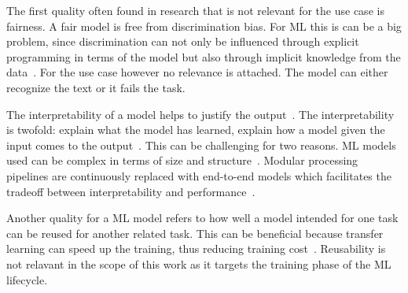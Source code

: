 The first quality often found in research that is not relevant for the use case is fairness.
A fair model is free from discrimination bias.
For \ac{ML} this is can be a big problem, since discrimination can not only be influenced through
explicit programming in terms of the model but also through implicit knowledge from the
data~\citep{vogelsang_requirements_2019}.
For the use case however no relevance is attached.
The model can either recognize the text or it fails the task.

The interpretability of a model helps to justify the output~\citep{ashmore_assuring_2021}.
The interpretability is twofold: explain what the model has learned, explain how a model given the
input comes to the output~\citep{vogelsang_requirements_2019}.
This can be challenging for two reasons.
\ac{ML} models used can be complex in terms of size and structure~\citep{ashmore_assuring_2021}.
Modular processing pipelines are continuously replaced with end-to-end
models which facilitates the tradeoff between interpretability and
performance~\cite{arpteg_software_2018}.

Another quality for a \ac{ML} model refers to how well a model intended for one task can be reused
for another related task.
This can be beneficial because transfer learning can speed up the training, thus reducing training
cost~\citep{ashmore_assuring_2021}.
Reusability is not relavant in the scope of this work as it targets the training phase of the
\ac{ML} lifecycle.
